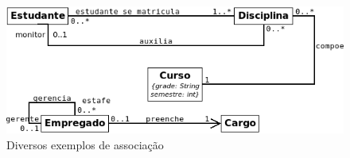 \begin{figure}
\begin{center}
\includegraphics[scale=0.6]{assocCls2.png} 
\caption{Diversos exemplos de associação} \label{fig:uml6}
\end{center}
\end{figure}

